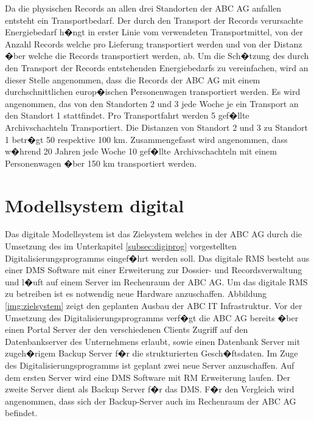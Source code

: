 \documentclass[a4paper,twoside,10pt]{report}
\begin{document}
Da die physischen Records an allen drei Standorten der ABC AG anfallen entsteht ein Transportbedarf. Der durch den Transport der Records verursachte Energiebedarf h�ngt in erster Linie vom verwendeten Transportmittel, von der Anzahl Records welche pro Lieferung transportiert werden und von der Distanz �ber welche die Records transportiert werden, ab. Um die Sch�tzung des durch den Transport der Records entstehenden Energiebedarfs zu vereinfachen, wird an dieser Stelle angenommen, dass die Records der ABC AG mit einem durchschnittlichen europ�ischen Personenwagen transportiert werden. Es wird angenommen, das von den Standorten 2 und 3 jede Woche je ein Transport an den Standort 1 stattfindet. Pro Transportfahrt werden 5 gef�llte Archivschachteln Transportiert. Die Distanzen von Standort 2 und 3 zu Standort 1 
betr�gt 50 respektive 100 km. Zusammengefasst wird angenommen, dass w�hrend 20 Jahren jede Woche 10 gef�llte Archivschachteln mit einem Personenwagen �ber 150 km transportiert werden. 

\section{Modellsystem digital}\label{sec:modell_digital}
Das digitale Modellsystem ist das Zielsystem welches in der ABC AG durch die Umsetzung des im Unterkapitel \ref{subsec:digiprog} vorgestellten Digitalisierungsprogramms eingef�hrt werden soll. Das digitale \ac{RMS} besteht aus einer DMS Software mit einer Erweiterung zur Dossier- und Recordsverwaltung und l�uft auf einem Server im Rechenraum der ABC AG. Um das digitale \ac{RMS} zu betreiben ist es notwendig neue Hardware anzuschaffen. Abbildung \ref{img:zielsystem} zeigt den geplanten Ausbau der ABC IT Infrastruktur. Vor der Umsetzung des Digitalisierungsprogramms verf�gt die ABC AG bereits �ber einen Portal Server der den verschiedenen Clients Zugriff auf den Datenbankserver des Unternehmens erlaubt, sowie einen Datenbank Server mit zugeh�rigem Backup Server f�r die strukturierten Gesch�ftsdaten. Im Zuge des Digitalisierungsprogramms ist geplant zwei neue Server anzuschaffen. Auf dem ersten Server wird eine DMS Software mit \ac{RM} Erweiterung laufen. Der zweite Server dient als Backup Server f�r das \ac{DMS}. F�r den Vergleich wird angenommen, dass sich der Backup-Server auch im Rechenraum der ABC AG befindet.
\end{document}

